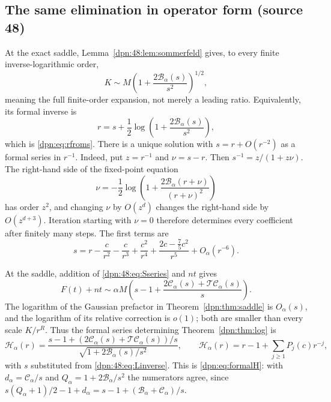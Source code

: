 \documentclass[11pt]{article}
\numberwithin{equation}{section}
\theoremstyle{definition}\newtheorem{definition}[theorem]{Definition}
\theoremstyle{remark}\newtheorem{remark}[theorem]{Remark}
\newcommand{\asym}{\mathscr H_{\alpha}}
\newcommand{\src}[1]{\textup{(source #1)}}
\newcommand{\Cop}{\mathcal C_\alpha}
\newcommand{\Bop}{\mathcal B_\alpha}
\newcommand{\Top}{\mathcal T}
\begin{document}
\subsection{The same elimination in operator form \src{48}}\label{dpn:48:sec:formal}
At the exact saddle, Lemma~\ref{dpn:48:lem:sommerfeld} gives, to every finite
inverse-logarithmic order,
\begin{equation}\label{dpn:48:eq:xr}
 K\sim M\left(1+\frac{2\Bop(s)}{s^2}\right)^{1/2},
\end{equation}
meaning the full finite-order expansion, not merely a leading ratio.
Equivalently, its formal inverse is
\begin{equation}\label{dpn:48:eq:Linverse}
 r=s+\frac12\log\left(1+\frac{2\Bop(s)}{s^2}\right),
\end{equation}
which is \eqref{dpn:eq:rfroms}.  There is a unique solution with
$s=r+O(r^{-2})$ as a formal series in $r^{-1}$.  Indeed, put $z=r^{-1}$ and
$\nu=s-r$.  Then $s^{-1}=z/(1+z\nu)$.  The right-hand side of the fixed-point
equation
\[
 \nu=-\frac12\log\left(1+\frac{2\Bop(r+\nu)}{(r+\nu)^2}\right)
\]
has order $z^2$, and changing $\nu$ by $O(z^d)$ changes the right-hand side by
$O(z^{d+3})$.  Iteration starting with $\nu=0$ therefore determines every
coefficient after finitely many steps.  The first terms are
\begin{equation}\label{dpn:48:eq:sfirst}
 s=r-\frac c{r^2}-\frac c{r^3}+\frac{c^2}{r^4}
       +\frac{2c-\tfrac75c^2}{r^5}+O_\alpha(r^{-6}).
\end{equation}

At the saddle, addition of \eqref{dpn:48:eq:Sseries} and $nt$ gives
\begin{equation}\label{dpn:48:eq:Legendre}
 F(t)+nt\sim\alpha M\left(s-1+\frac{2\Cop(s)+\Top\Cop(s)}{s}\right).
\end{equation}
The logarithm of the Gaussian prefactor in Theorem~\ref{dpn:thm:saddle} is
$O_\alpha(s)$, and the logarithm of its relative correction is $o(1)$; both
are smaller than every scale $K/r^R$.  Thus the formal series determining
Theorem~\ref{dpn:thm:log} is
\begin{equation}\label{dpn:48:eq:Hrule}
 \boxed{\displaystyle
 \asym(r)=
 \frac{s-1+(2\Cop(s)+\Top\Cop(s))/s}
      {\sqrt{1+2\Bop(s)/s^2}},
 \qquad
 \asym(r)=r-1+\sum_{j\ge1}P_j(c)r^{-j},}
\end{equation}
with $s$ substituted from \eqref{dpn:48:eq:Linverse}.  This is
\eqref{dpn:eq:formalH}: with $d_\alpha=\Cop/s$ and $Q_\alpha=1+2\Bop/s^2$ the
numerators agree, since $s(Q_\alpha+1)/2-1+d_\alpha=s-1+(\Bop+\Cop)/s$.
\end{document}
